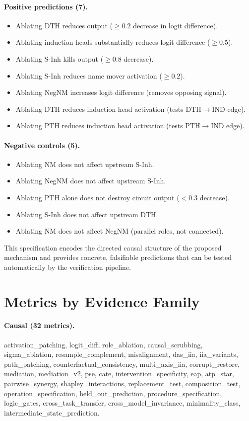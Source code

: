 \documentclass[10pt]{article}
\begin{document}
\paragraph{Positive predictions (7).}
\begin{itemize}[nosep]
    \item Ablating DTH reduces output ($\geq 0.2$ decrease in logit difference).
    \item Ablating induction heads substantially reduces logit difference ($\geq 0.5$).
    \item Ablating S-Inh kills output ($\geq 0.8$ decrease).
    \item Ablating S-Inh reduces name mover activation ($\geq 0.2$).
    \item Ablating NegNM increases logit difference (removes opposing signal).
    \item Ablating DTH reduces induction head activation (tests DTH$\rightarrow$IND edge).
    \item Ablating PTH reduces induction head activation (tests PTH$\rightarrow$IND edge).
\end{itemize}

\paragraph{Negative controls (5).}
\begin{itemize}[nosep]
    \item Ablating NM does not affect upstream S-Inh.
    \item Ablating NegNM does not affect upstream S-Inh.
    \item Ablating PTH alone does not destroy circuit output ($< 0.3$ decrease).
    \item Ablating S-Inh does not affect upstream DTH.
    \item Ablating NM does not affect NegNM (parallel roles, not connected).
\end{itemize}

This specification encodes the directed causal structure of the proposed mechanism and provides concrete, falsifiable predictions that can be tested automatically by the verification pipeline.

\section{Metrics by Evidence Family}
\label{app:metrics}

\paragraph{Causal (32 metrics).} activation\_patching, logit\_diff, role\_ablation, causal\_scrubbing, sigma\_ablation, resample\_complement, misalignment, das\_iia, iia\_variants, path\_patching, counterfactual\_consistency, multi\_axis\_iia, corrupt\_restore, mediation, mediation\_v2, pse, cate, intervention\_specificity, eap, atp\_star, pairwise\_synergy, shapley\_interactions, replacement\_test, composition\_test, operation\_specification, held\_out\_prediction, procedure\_specification, logic\_gates, cross\_task\_transfer, cross\_model\_invariance, minimality\_class, intermediate\_state\_prediction.
\end{document}
